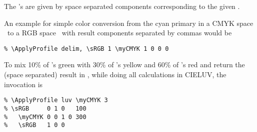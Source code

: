 \documentclass{l3doc}
\begin{document}
\begin{documentation}
\begin{function}{\ApplyProfile}
  The 's are given by space separated components corresponding to the given .

  An example for simple color conversion from the cyan primary in a CMYK space \cmd\myCMYK\ to a RGB space \cmd\sRGB\ with result components separated by commas would be
\begin{verbatim}
% \ApplyProfile delim, \sRGB 1 \myCMYK 1 0 0 0
\end{verbatim}

To mix 10\% of \cmd\sRGB's green with 30\% of \cmd\myCMYK's yellow and 60\% of \cmd\sRGB's red and return the (space separated) result in \cmd\myCMYK, while doing all calculations in CIELUV, the invocation is
\begin{verbatim}
% \ApplyProfile luv \myCMYK 3
% \sRGB     0 1 0   100
%   \myCMYK 0 0 1 0 300
%   \sRGB   1 0 0
\end{verbatim}
\end{function}

\end{documentation}
\end{document}
